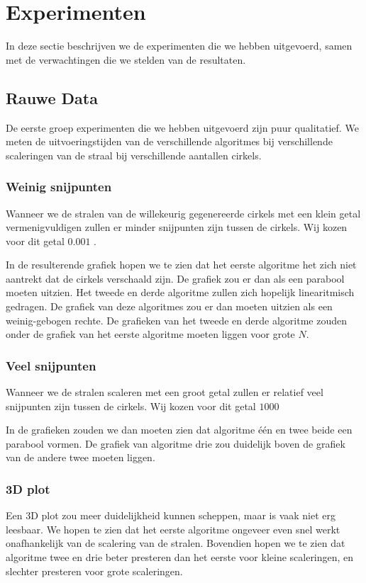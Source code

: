 \section{Experimenten}
In deze sectie beschrijven we de experimenten die we hebben uitgevoerd, samen met de verwachtingen die we stelden van de resultaten.

\subsection{Rauwe Data}
De eerste groep experimenten die we hebben uitgevoerd zijn puur qualitatief. We meten de uitvoeringstijden van de verschillende algoritmes bij verschillende scaleringen van de straal bij verschillende aantallen cirkels.

\subsubsection{Weinig snijpunten}
Wanneer we de stralen van de willekeurig gegenereerde cirkels met een klein getal vermenigvuldigen zullen er minder snijpunten zijn tussen de cirkels. Wij kozen voor dit getal $0.001$ .

In de resulterende grafiek hopen we te zien dat het eerste algoritme het zich niet aantrekt dat de cirkels verschaald zijn. De grafiek zou er dan als een parabool moeten uitzien. Het tweede en derde algoritme zullen zich hopelijk linearitmisch gedragen. De grafiek van deze algoritmes zou er dan moeten uitzien als een weinig-gebogen rechte. De grafieken van het tweede en derde algoritme zouden onder de grafiek van het eerste algoritme moeten liggen voor grote $N$.

\subsubsection{Veel snijpunten}
Wanneer we de stralen scaleren met een groot getal zullen er relatief veel snijpunten zijn tussen de cirkels. Wij kozen voor dit getal $1000$ 

In de grafieken zouden we dan moeten zien dat algoritme \'e\'en en twee beide een parabool vormen. De grafiek van algoritme drie zou duidelijk boven de grafiek van de andere twee moeten liggen.

\subsubsection{3D plot}
Een 3D plot zou meer duidelijkheid kunnen scheppen, maar is vaak niet erg leesbaar. We hopen te zien dat het eerste algoritme ongeveer even snel werkt onafhankelijk van de scalering van de stralen. Bovendien hopen we te zien dat algoritme twee en drie beter presteren dan het eerste voor kleine scaleringen, en slechter presteren voor grote scaleringen.


